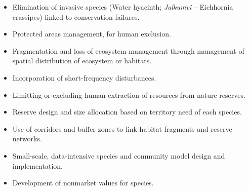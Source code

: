 \documentclass[
  ignorenonframetext,
  aspectratio=169]{beamer}
\providecommand{\tightlist}{%
  \setlength{\itemsep}{0pt}\setlength{\parskip}{0pt}}
\begin{document}
\begin{frame}{}
\protect\hypertarget{section-10}{}
\begin{itemize}
\tightlist
\item
  Elimination of invasive species (Water hyacinth; \emph{Jalkumvi} --
  Eichhornia crassipes) linked to conservation failures.
\item
  Protected areas management, for human exclusion.
\item
  Fragmentation and loss of ecosystem management through management of
  spatial distribution of ecosystem or habitats.
\item
  Incorporation of short-frequency disturbances.
\item
  Limitting or excluding human extraction of resources from nature
  reserves.
\item
  Reserve design and size allocation based on territory need of each
  species.
\item
  Use of corridors and buffer zones to link habitat fragments and
  reserve networks.
\item
  Small-scale, data-intensive species and community model design and
  implementation.
\item
  Development of nonmarket values for species.
\end{itemize}
\end{frame}
\end{document}
